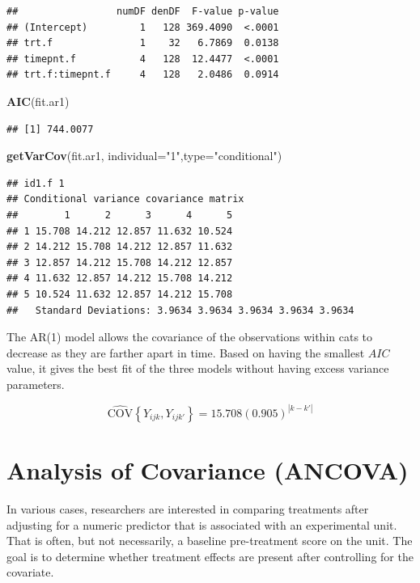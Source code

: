 \documentclass[
]{book}
\newenvironment{Shaded}{\begin{snugshade}}{\end{snugshade}}
\newcommand{\AttributeTok}[1]{\textcolor[rgb]{0.13,0.29,0.53}{#1}}
\newcommand{\FunctionTok}[1]{\textcolor[rgb]{0.13,0.29,0.53}{\textbf{#1}}}
\newcommand{\NormalTok}[1]{#1}
\newcommand{\StringTok}[1]{\textcolor[rgb]{0.31,0.60,0.02}{#1}}
\begin{document}
\begin{verbatim}
##                 numDF denDF  F-value p-value
## (Intercept)         1   128 369.4090  <.0001
## trt.f               1    32   6.7869  0.0138
## timepnt.f           4   128  12.4477  <.0001
## trt.f:timepnt.f     4   128   2.0486  0.0914
\end{verbatim}

\begin{Shaded}
\begin{Highlighting}[]
\FunctionTok{AIC}\NormalTok{(fit.ar1)}
\end{Highlighting}
\end{Shaded}

\begin{verbatim}
## [1] 744.0077
\end{verbatim}

\begin{Shaded}
\begin{Highlighting}[]
\FunctionTok{getVarCov}\NormalTok{(fit.ar1, }\AttributeTok{individual=}\StringTok{"1"}\NormalTok{,}\AttributeTok{type=}\StringTok{"conditional"}\NormalTok{)}
\end{Highlighting}
\end{Shaded}

\begin{verbatim}
## id1.f 1 
## Conditional variance covariance matrix
##        1      2      3      4      5
## 1 15.708 14.212 12.857 11.632 10.524
## 2 14.212 15.708 14.212 12.857 11.632
## 3 12.857 14.212 15.708 14.212 12.857
## 4 11.632 12.857 14.212 15.708 14.212
## 5 10.524 11.632 12.857 14.212 15.708
##   Standard Deviations: 3.9634 3.9634 3.9634 3.9634 3.9634
\end{verbatim}

The AR(1) model allows the covariance of the observations within cats to
decrease as they are farther apart in time. Based on having the smallest
\(AIC\) value, it gives the best fit of the three models without having
excess variance parameters.

\[
\hat{\mbox{COV}}\left\{Y_{ijk},Y_{ijk'}\right\} = 15.708(0.905)^{|k-k'|}
\]

\chapter{Analysis of Covariance
(ANCOVA)}\label{analysis-of-covariance-ancova}

In various cases, researchers are interested in comparing treatments
after adjusting for a numeric predictor that is associated with an
experimental unit. That is often, but not necessarily, a baseline
pre-treatment score on the unit. The goal is to determine whether
treatment effects are present after controlling for the covariate.
\end{document}
